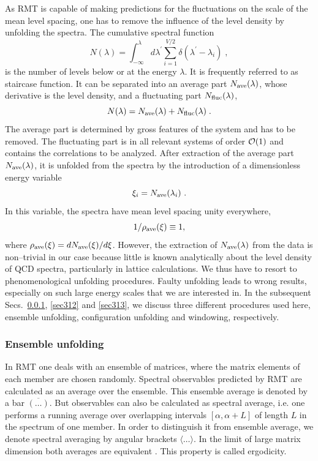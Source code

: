 As RMT is capable of making predictions for the fluctuations on the
scale of the mean level spacing, one has to remove the influence of
the level density by unfolding the spectra.  The cumulative spectral
function
\begin{equation}
N(\lambda)=
        \int_{-\infty}^\lambda d\lambda^\prime
        \sum_{i=1}^{V/2}\delta(\lambda^\prime-\lambda_i)\;,
\label{staircase}
\end{equation}
is the number of levels below or at the energy $\lambda$. It is
frequently referred to as staircase function.  It can be separated
into an average part $N_{\rm ave}(\lambda)$, whose derivative is the
level density, and a fluctuating part $N_{\rm fluc}(\lambda)$,
\begin{equation}
  N(\lambda)=N_{\rm ave}(\lambda)+N_{\rm fluc}(\lambda)\;.
\end{equation}
The average part is determined by gross features
of the system and has to be removed.  The fluctuating part is in
all relevant systems of order ${\cal O}(1)$ and contains the
correlations to be analyzed. After extraction of the average part
$N_{\rm ave}(\lambda)$, it is unfolded from the spectra by the
introduction of a dimensionless energy variable
\begin{equation}
\xi_i=N_{\rm ave}(\lambda_i) \ .
\end{equation}
In this variable, the spectra have mean level spacing unity
everywhere,
\begin{equation}
1/\rho_{\rm ave}(\xi)\equiv 1,
\label{lsone}
\end{equation}
where $\rho_{\rm ave}(\xi)=dN_{\rm ave}(\xi)/d\xi$. However, the
extraction of $N_{\rm ave}(\lambda)$ from the data is non--trivial in
our case because little is known analytically about the level density
of QCD spectra, particularly in lattice calculations. We thus have to
resort to phenomenological unfolding procedures.  Faulty unfolding
leads to wrong results, especially on such large energy scales that we
are interested in. In the subsequent Secs.~\ref{sec311},
\ref{sec312} and \ref{sec313}, we discuss three different procedures
used here, ensemble unfolding, configuration unfolding and windowing,
respectively.

\subsubsection{Ensemble unfolding}
\label{sec311}
In RMT one deals with an ensemble of matrices, where the matrix
elements of each member are chosen randomly. Spectral observables
predicted by RMT are calculated as an average over the ensemble.  This
ensemble average is denoted by a bar $\overline{(\ldots)}$.  But
observables can also be calculated as spectral average, i.e.  one
performs a running average over overlapping intervals
$[\alpha,\alpha+L]$ of length $L$ in the spectrum of one member.  In
order to distinguish it from ensemble average, we denote spectral
averaging by angular brackets $\langle\ldots\rangle$. In the limit of
large matrix dimension both averages are equivalent \cite{guhr97}.
This property is called ergodicity.

